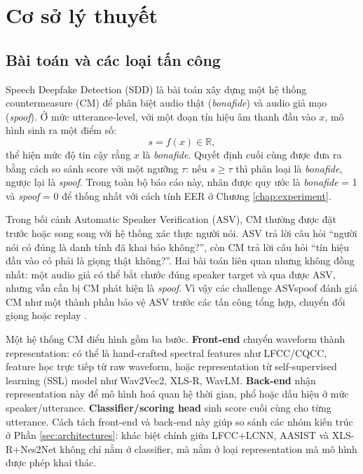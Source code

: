 ﻿\chapter{Cơ sở lý thuyết} \label{chap:background}

\section{Bài toán và các loại tấn công}

Speech Deepfake Detection (SDD) là bài toán xây dựng một hệ thống countermeasure (CM) để phân biệt audio thật (\textit{bonafide}) và audio giả mạo (\textit{spoof}). Ở mức utterance-level, với một đoạn tín hiệu âm thanh đầu vào $x$, mô hình sinh ra một điểm số:
\begin{equation}
    s = f(x) \in \mathbb{R},
\end{equation}
thể hiện mức độ tin cậy rằng $x$ là \textit{bonafide}. Quyết định cuối cùng được đưa ra bằng cách so sánh score với một ngưỡng $\tau$: nếu $s \geq \tau$ thì phân loại là \textit{bonafide}, ngược lại là \textit{spoof}. Trong toàn bộ báo cáo này, nhãn được quy ước là \textit{bonafide} = 1 và \textit{spoof} = 0 để thống nhất với cách tính EER ở Chương \ref{chap:experiment}.

Trong bối cảnh Automatic Speaker Verification (ASV), CM thường được đặt trước hoặc song song với hệ thống xác thực người nói. ASV trả lời câu hỏi ``người nói có đúng là danh tính đã khai báo không?'', còn CM trả lời câu hỏi ``tín hiệu đầu vào có phải là giọng thật không?''. Hai bài toán liên quan nhưng không đồng nhất: một audio giả có thể bắt chước đúng speaker target và qua được ASV, nhưng vẫn cần bị CM phát hiện là \textit{spoof}. Vì vậy các challenge ASVspoof đánh giá CM như một thành phần bảo vệ ASV trước các tấn công tổng hợp, chuyển đổi giọng hoặc replay \cite{asvspoof2019,asvspoof2021}.

Một hệ thống CM điển hình gồm ba bước. \textbf{Front-end} chuyển waveform thành representation: có thể là hand-crafted spectral features như LFCC/CQCC, feature học trực tiếp từ raw waveform, hoặc representation từ self-supervised learning (SSL) model như Wav2Vec2, XLS-R, WavLM. \textbf{Back-end} nhận representation này để mô hình hoá quan hệ thời gian, phổ hoặc dấu hiệu ở mức speaker/utterance. \textbf{Classifier/scoring head} sinh score cuối cùng cho từng utterance. Cách tách front-end và back-end này giúp so sánh các nhóm kiến trúc ở Phần \ref{sec:architectures}: khác biệt chính giữa LFCC+LCNN, AASIST và XLS-R+Nes2Net không chỉ nằm ở classifier, mà nằm ở loại representation mà mô hình được phép khai thác.

